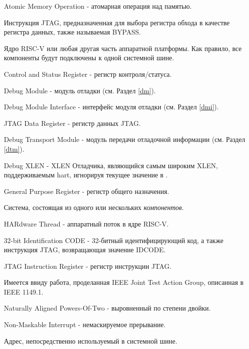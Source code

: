 \begin{description}[style=nextline]
    \item[AMO]
        Atomic Memory Operation - атомарная операция над памятью.
    \item[BYPASS]
        Инструкция JTAG, предназначенная для выбора регистра обхода в качестве регистра данных, также называемая BYPASS.
    \item[компонент]
        Ядро RISC-V или любая другая часть аппаратной платформы.
        Как правило, все компоненты будут подключены к одной системной
        шине.
    \item[CSR]
        Control and Status Register - регистр контроля/статуса.
    \item[DM]
        Debug Module - модуль отладки (см. Раздел \ref{dm}).
    \item[DMI]
        Debug Module Interface - интерфейс модуля отладки (см. Раздел \ref{dmi}).
    \item[DR]
        JTAG Data Register - регистр данных JTAG.
    \item[DTM]
        Debug Transport Module - модуль передачи отладочной информации (см. Раздел \ref{dtm}).
    \item[DXLEN]
        Debug XLEN - XLEN Отладчика, являющийся самым широким XLEN,
        поддерживаемым hart, игнорируя текущее значение \Fmxl в \Rmisa.
    \item[GPR]
        General Purpose Register - регистр общего назначения.
    \item[аппаратная платформа]
        Система, состоящая из одного или нескольких \emph{компонентов}.
    \item[hart]
        HARdware Thread - аппаратный поток в ядре RISC-V.
    \item[IDCODE]
        32-bit Identification CODE - 32-битный идентифицирующий код, а также инструкция JTAG,
        возвращающая значение IDCODE.
    \item[IR]
        JTAG Instruction Register - регистр инструкции JTAG.
    \item[JTAG]
        Имеется ввиду работа, проделанная IEEE Joint Test Action Group, описанная в
        IEEE 1149.1.
    \item[NAPOT]
        Naturally Aligned Powers-Of-Two - выровненный по степени двойки.
    \item[NMI]
        Non-Maskable Interrupt - немаскируемое прерывание.
    \item[физический адрес]
        Адрес, непосредственно используемый в системной шине.

\end{description}

